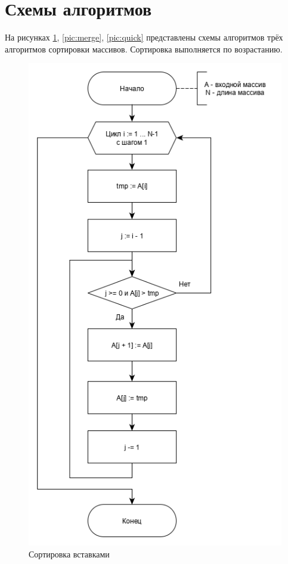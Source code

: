 \documentclass[12pt, a4paper]{report}
\begin{document}
	\section{Схемы алгоритмов}
	На рисунках \ref{pic:insert}, \ref{pic:merge}, \ref{pic:quick} представлены схемы алгоритмов трёх алгоритмов сортировки массивов. Сортировка выполняется по возрастанию.
	\begin{figure}[ht!]
		\centering
		\includegraphics[scale=0.55]{insert.png}
		\caption{Сортировка вставками}
		\label{pic:insert}
	\end{figure}
	\newpage
\end{document}
